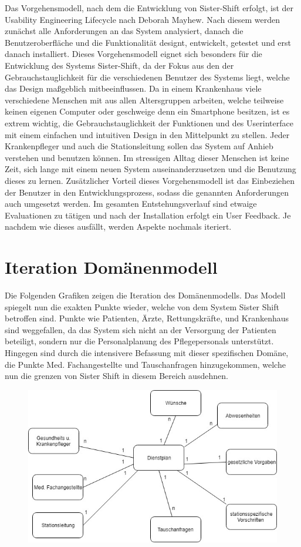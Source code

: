 \documentclass[11pt,
paper=a4,
bibtotocnumbered,	  %
liststotocnumbered,  %
DIV=calc,		  %
tablecaptionabove,	  %
headinclude,
]{article}
\begin{document}
Das Vorgehensmodell, nach dem die Entwicklung von Sister-Shift erfolgt, ist der Usability Engineering Lifecycle nach Deborah Mayhew. Nach diesem werden zunächst alle Anforderungen an das System analysiert, danach die Benutzeroberfläche und die Funktionalität designt, entwickelt, getestet und erst danach installiert. Dieses Vorgehensmodell eignet sich besonders für die Entwicklung des Systems Sister-Shift, da der Fokus aus den der Gebrauchstauglichkeit für die verschiedenen Benutzer des Systems liegt, welche das Design maßgeblich mitbeeinflussen. Da in einem Krankenhaus viele verschiedene Menschen mit aus allen Altersgruppen arbeiten, welche teilweise keinen eigenen Computer oder geschweige denn ein Smartphone besitzen, ist es extrem wichtig, die Gebrauchstauglichkeit der Funktionen und des Userinterface mit einem einfachen und intuitiven Design in den Mittelpunkt zu stellen. Jeder Krankenpfleger und auch die Stationsleitung sollen das System auf Anhieb verstehen und benutzen können. Im stressigen Alltag dieser Menschen ist keine Zeit, sich lange mit einem neuen System auseinanderzusetzen und die Benutzung dieses zu lernen. Zusätzlicher Vorteil dieses Vorgehensmodell ist das Einbeziehen der Benutzer in den Entwicklungsprozess, sodass die genannten Anforderungen auch umgesetzt werden. Im gesamten Entstehungsverlauf sind etwaige Evaluationen zu tätigen und nach der Installation erfolgt ein User Feedback. Je nachdem wie dieses ausfällt, werden Aspekte nochmals iteriert.

\section{Iteration Domänenmodell}
Die Folgenden Grafiken zeigen die Iteration des Domänenmodells. Das Modell spiegelt nun die exakten Punkte wieder, welche von dem System Sister Shift betroffen sind. Punkte wie Patienten, Ärzte, Rettungskräfte, und Krankenhaus sind weggefallen, da das System sich nicht an der Versorgung der Patienten beteiligt, sondern nur die Personalplanung des Pflegepersonals unterstützt. Hingegen sind durch die intensivere Befassung mit dieser spezifischen Domäne, die Punkte Med. Fachangestellte und Tauschanfragen hinzugekommen, welche nun die grenzen von Sister Shift in diesem Bereich ausdehnen. 

\begin{figure}[H]
\includegraphics[width=1\textwidth]{Bilder/Domaenenmodell.jpg}
\end{figure}
\end{document}
